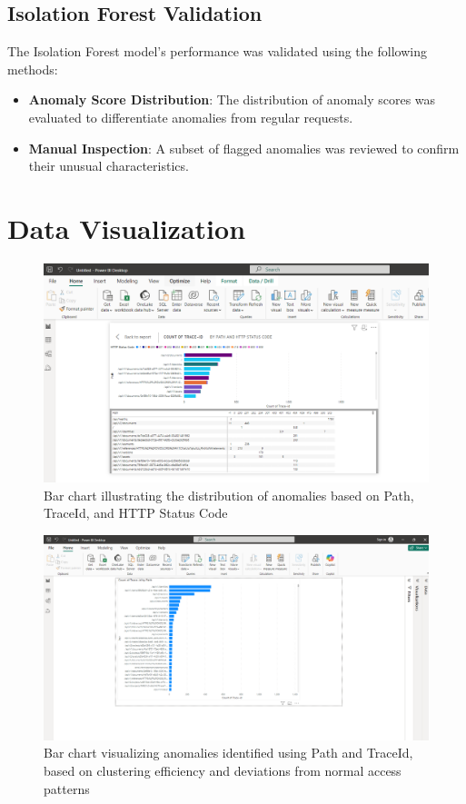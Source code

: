 \subsection{Isolation Forest Validation}
The Isolation Forest model's performance was validated using the following methods:
\begin{itemize}
	\item \textbf{Anomaly Score Distribution}: The distribution of anomaly scores was evaluated to differentiate anomalies from regular requests.
	\item \textbf{Manual Inspection}: A subset of flagged anomalies was reviewed to confirm their unusual characteristics.
\end{itemize}

\section{Data Visualization}

\begin{figure}
	\begin{center}
		\includegraphics[width=0.7\linewidth]{Images/PowerBI1.png}
		\caption{Bar chart illustrating the distribution of anomalies based on Path, TraceId, and HTTP Status Code}
		\label{PowerBI1} 
	\end{center}
\end{figure}

\begin{figure}
	\begin{center}
		\includegraphics[width=0.7\linewidth]{Images/PowerBI2.png}
		\caption{Bar chart visualizing anomalies identified using Path and TraceId, based on clustering efficiency and deviations from normal access patterns}
		\label{PowerBI2} 
	\end{center}
\end{figure}

